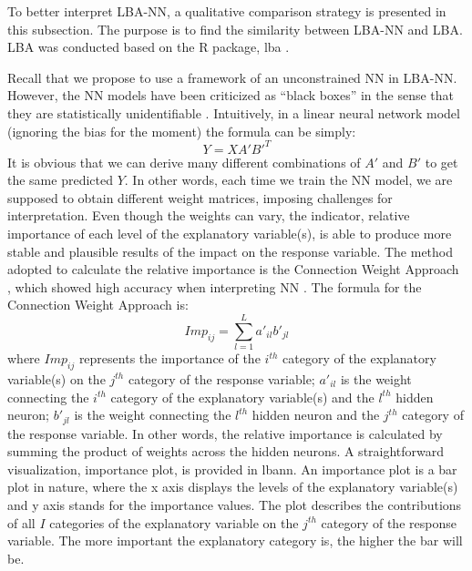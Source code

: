 \documentclass[]{interact}
\theoremstyle{plain}%
\theoremstyle{definition}
\theoremstyle{remark}
\begin{document}
To better interpret LBA-NN, a qualitative comparison strategy is
presented in this subsection. The purpose is to find the similarity
between LBA-NN and LBA. LBA was conducted based on the R package,
\textsf{lba} \citep{lba2018}.

Recall that we propose to use a framework of an unconstrained NN in
LBA-NN. However, the NN models have been criticized as ``black boxes''
in the sense that they are statistically unidentifiable
\citep{zhang2018}. Intuitively, in a linear neural network model
(ignoring the bias for the moment) the formula can be simply:
\begin{equation}
  Y = XA'B'^T \tag{4.1}
\end{equation} It is obvious that we can derive many different
combinations of \(A'\) and \(B'\) to get the same predicted \(Y\). In
other words, each time we train the NN model, we are supposed to obtain
different weight matrices, imposing challenges for interpretation. Even
though the weights can vary, the indicator, relative importance of each
level of the explanatory variable(s), is able to produce more stable and
plausible results of the impact on the response variable. The method
adopted to calculate the relative importance is the Connection Weight
Approach \citep{olden2002}, which showed high accuracy when interpreting
NN \citep{olden2004}. The formula for the Connection Weight Approach is:
\begin{equation}
  Imp_{ij} = \sum^L_{l=1}{a'_{il}b'_{jl}} \tag{4.2}
\end{equation} where \(Imp_{ij}\) represents the importance of the
\(i^{th}\) category of the explanatory variable(s) on the \(j^{th}\)
category of the response variable; \(a'_{il}\) is the weight connecting
the \(i^{th}\) category of the explanatory variable(s) and the
\(l^{th}\) hidden neuron; \(b'_{jl}\) is the weight connecting the
\(l^{th}\) hidden neuron and the \(j^{th}\) category of the response
variable. In other words, the relative importance is calculated by
summing the product of weights across the hidden neurons. A
straightforward visualization, importance plot, is provided in
\textsf{lbann}. An importance plot is a bar plot in nature, where the x
axis displays the levels of the explanatory variable(s) and y axis
stands for the importance values. The plot describes the contributions
of all \(I\) categories of the explanatory variable on the \(j^{th}\)
category of the response variable. The more important the explanatory
category is, the higher the bar will be.
\end{document}
